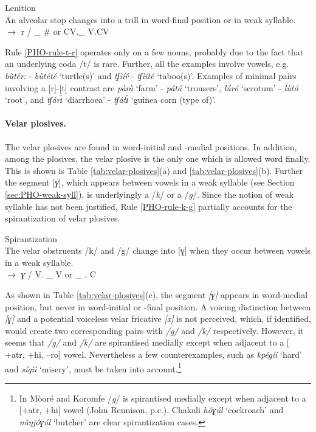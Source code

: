 \begin{Rule}\label{PHO-rule-t-r}{Lenition}\\
An  alveolar stop changes into a  trill in word-final position or in weak
syllable.\\
 {} $\rightarrow$  r   /   \_ \#  or  CV.\_ V.CV
\end{Rule}

Rule \ref{PHO-rule-t-r} operates  only on a few nouns, probably due to the fact 
that an underlying coda /t/ is rare.  Further,  all the examples involve {\sc 
[+atr, --ro]} vowels,  e.g. {\it bùtérː} - {\it bùtété} `turtle(s)' and 
{\it tʃìíŕ} - {\it tʃìíté} `taboo(s)'.  Examples of minimal pairs 
involving 
a [r]-[t] contrast are  \textit{pàrà}  `farm' -  \textit{pátá}  `trousers', 
\textit{lúró} `scrotum' - \textit{lùtó} `root', and \textit{tʃárɪ̀} 
`diarrhoea' - \textit{tʃátɪ̀} `guinea corn (type of)'.


\paragraph{Velar plosives.}
\label{sec:PHO-vel-plos}  

The velar plosives are found in word-initial and -medial positions. In addition, 
among the plosives,  the velar plosive is the only one which is allowed word 
finally. This is shown is Table \ref{tab:velar-plosives}(a)  and 
\ref{tab:velar-plosives}(b). Further the segment [{\it ɣ}], which appears 
between vowels in a weak syllable (see Section \ref{sec:PHO-weak-syll}),  is 
underlyingly a /{\it k}/ or a  /{\it g}/. Since the notion of weak syllable has 
not been justified, Rule \ref{PHO-rule-k-g} partially accounts for the 
spirantization  of velar plosives.


\begin{Rule}\label{PHO-rule-k-g}{Spirantization}\\
The velar obstruents  /k/ and /g/  change into  [ɣ]  when they occur
between vowels in a weak syllable.\\
{}  $\rightarrow$  {\it ɣ}  /  V. \_ V or  \_ . C
\end{Rule}


As shown in Table \ref{tab:velar-plosives}(c), the segment {\it [ɣ]} appears in 
word-medial position, but never in word-initial or  -final position.  A  voicing 
distinction between {\it [ɣ]} and a potential voiceless velar fricative {\it 
[x]} is not perceived, which,  if identified, would create two corresponding 
pairs with {\it /g/} and {\it /k/} respectively. However, it seems that {\it 
/g/} and {\it /k/} are spirantised medially except when adjacent to a [{\sc 
+atr}, {\sc +hi}, {\sc --ro}] vowel. Nevertheless a few counterexamples, such as 
\textit{kpégíí} `hard' and \textit{sígìì} `misery',  must be taken into 
account.\footnote{In Mòoré and Koromfe /{\it g}/ is spirantised medially 
except when adjacent to a [{\sc +atr}, {\sc +hi}] vowel  (John Rennison, p.c.). 
Chakali  \textit{hóɣúl} `cockroach' and \textit{nàŋjóɣúl} `butcher'  are clear 
spirantization cases.}





